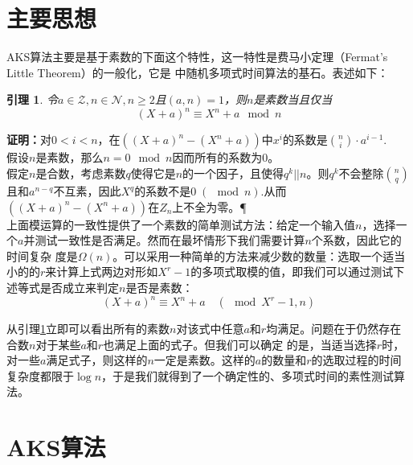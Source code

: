 \documentclass[a4paper,notitlepage]{article}
\newtheorem{lemma}{引理}[section]
\numberwithin{equation}{section}
\begin{document}
\begin{multicols}{2}
  \section{主要思想}
  AKS算法主要是基于素数的下面这个特性，这一特性是费马小定理（Fermat’s Little
  Theorem）的一般化，它是\cite{AB03} 中随机多项式时间算法的基石。表述如下：
  \begin{lemma}\label{idea}
    \upshape 令$a\in \mathcal{Z},n\in \mathcal{N},n\ge
    2$且$(a,n)=1$，则$n$是素数当且仅当
    \begin{equation}
      (X+a)^{n}\equiv X^n+a\mod{n}
    \end{equation}
  \end{lemma}
  \noindent \textbf{证明：}对$0<i<n$，在$((X+a)^n - (X^n +
  a))$中$x^i$的系数是$\binom{n}{i}\cdot a^{i-1}$.\\[0.2cm]
  假设$n$是素数，那么$n=0\mod{n}$因而所有的系数为0。\\[0.2cm]
  假定$n$是合数，考虑素数$q$使得它是$n$的一个因子，且使得$q^k||n$。则$q^k$不会整除$\binom{n}{q}$且和$a^{
    n-q}$不互素，因此$X^q$的系数不是$0\;(\!\!\!\!\!\mod{n})$.从而$((X+a)^n-(X^n+a))$在$\mathit{Z}_n$上不全为零。\P\\[0.2cm]
  上面模运算的一致性提供了一个素数的简单测试方法：给定一个输入值$n$，选择一个$a$并测试一致性是否满足。然而在最坏情形下我们需要计算$n$个系数，因此它的时间复杂
  度是$\Omega
  (n)$。可以采用一种简单的方法来减少数的数量：选取一个适当小的的$r$来计算上式两边对形如$X^r-1$的多项式取模的值，即我们可以通过测试下述等式是否成立来判定$n$是否是素数：
  \begin{equation}\label{key}
    (X+a)^n\equiv X^n+a \quad(\!\!\!\!\!\mod{X^r-1},n)
  \end{equation}

  从引理\ref{idea}立即可以看出所有的素数$n$对该式中任意$a$和$r$均满足。问题在于仍然存在合数$n$对于某些$a$和$r$也满足上面的式子。但我们可以确定
  的是，当适当选择$r$时，对一些$a$满足式子，则这样的$n$一定是素数。这样的$a$的数量和$r$的选取过程的时间复杂度都限于$\log
  n$，于是我们就得到了一个确定性的、多项式时间的素性测试算法。
  \section{AKS算法}

\end{multicols}
\end{document}
